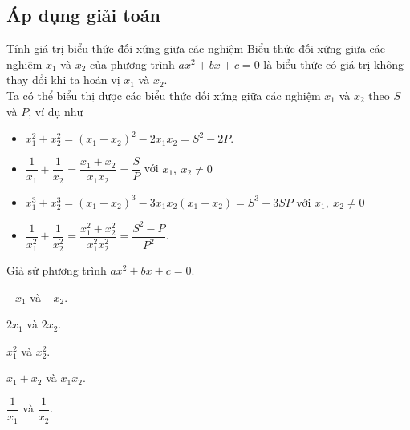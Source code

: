 \subsection{Áp dụng giải toán}
\begin{dang} {Tính giá trị biểu thức đối xứng giữa các nghiệm}
	Biểu thức đối xứng giữa các nghiệm $x_1$ và $x_2$ của phương trình $ax^2 + bx + c= 0$ là biểu thức có giá trị không thay đổi khi ta hoán vị $x_1$ và $x_2$.\\
	Ta có thể biểu thị được các biểu thức đối xứng giữa các nghiệm $x_1$ và $x_2$ theo $S$ và $P$, ví dụ như
	\begin{itemize}
	\item $x_1^2 + x_2^2 = (x_1 +x_2)^2 - 2x_1x_2 = S^2 -2P.$
	\item $\dfrac{1}{x_1} + \dfrac{1}{x_2} = \dfrac{x_1+x_2}{x_1x_2} = \dfrac{S}{P}$ với $x_1,\ x_2 \ne 0$
	\item $x_1^3 + x_2^3 =(x_1 +x_2)^3 - 3x_1x_2(x_1+x_2) = S^3 -3SP$ với $x_1,\ x_2 \ne 0$
	\item $\dfrac{1}{x_1^2} + \dfrac{1}{x_2^2} = \dfrac{x_1^2+x_2^2}{x_1^2x_2^2} = \dfrac{S^2 -P}{P^2}.$
	\end{itemize}
	\end{dang}
\begin{vd}
	Giả sử phương trình $ax^2 + bx+ c=0.$
	\begin{enumEX}{2}
		\item $-x_1$ và $-x_2$.
		\item $2x_1$ và $2x_2$.
		\item $x_1^2$ và $x_2^2.$
		\item $x_1 + x_2$ và $x_1x_2$.
		\item $\dfrac{1}{x_1}$ và $\dfrac{1}{x_2}$.
		\end{enumEX}
\end{vd}
